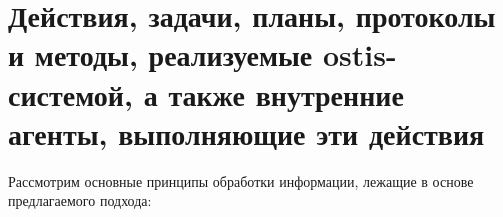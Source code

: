 \begin{SCn}
\begin{scnindent}
\begin{scnindent}
\end{scnindent}
\begin{scnindent}
\end{scnindent}
\begin{scnindent}
\begin{scnindent}
\end{scnindent}
\end{scnindent}
\end{scnindent}
\end{SCn}

\section{Действия, задачи, планы, протоколы и методы, реализуемые ostis-системой, а также внутренние агенты, выполняющие эти действия}

Рассмотрим основные принципы обработки информации, лежащие в основе предлагаемого подхода:

